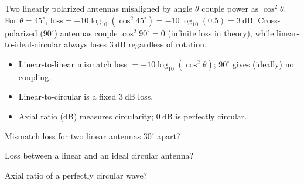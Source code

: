 \begin{workedexample}
Two linearly polarized antennas misaligned by angle $\theta$ couple power
as $\cos^2\theta$. For $\theta = 45^{\circ}$,
$\text{loss} = -10\log_{10}(\cos^2 45^{\circ}) = -10\log_{10}(0.5) = 3\ \text{dB}$.
Cross-polarized ($90^{\circ}$) antennas couple $\cos^2 90^{\circ} = 0$ (infinite
loss in theory), while linear-to-ideal-circular always loses $3\ \text{dB}$
regardless of rotation.
\end{workedexample}

\begin{keytakeaways}
\begin{itemize}[leftmargin=1.4em,itemsep=2pt]
\item Linear-to-linear mismatch loss $= -10\log_{10}(\cos^2\theta)$; $90^{\circ}$ gives (ideally) no coupling.
\item Linear-to-circular is a fixed $3\ \text{dB}$ loss.
\item Axial ratio (dB) measures circularity; $0\ \text{dB}$ is perfectly circular.
\end{itemize}
\end{keytakeaways}

\begin{exercises}
\item Mismatch loss for two linear antennas $30^{\circ}$ apart?
\item Loss between a linear and an ideal circular antenna?
\item Axial ratio of a perfectly circular wave?
\end{exercises}

